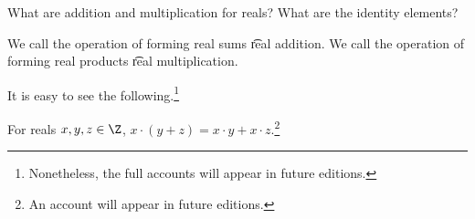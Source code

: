 

What are addition and multiplication for reals?
What are the identity elements?


We call the operation of forming real sums \t{real addition}.
We call the operation of forming real products \t{real multiplication}.


It is easy to see the following.\footnote{Nonetheless, the full accounts will appear in future editions.}


\begin{proposition}
  For reals $x, y, z \in \Z$, $x \cdot (y + z) = x\cdot y + x\cdot z$.\footnote{An account will appear in future editions.}
\end{proposition}

\blankpage

\blankpage
